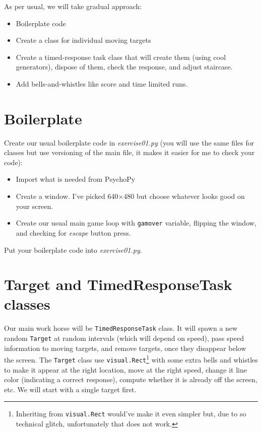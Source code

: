 \documentclass[
]{book}
\providecommand{\tightlist}{%
  \setlength{\itemsep}{0pt}\setlength{\parskip}{0pt}}
\begin{document}
As per usual, we will take gradual approach:

\begin{itemize}
\tightlist
\item
  Boilerplate code
\item
  Create a class for individual moving targets
\item
  Create a timed-response task class that will create them (using cool generators), dispose of them, check the response, and adjust staircase.
\item
  Add bells-and-whistles like score and time limited runs.
\end{itemize}

\hypertarget{boilerplate-1}{%
\section{Boilerplate}\label{boilerplate-1}}

Create our usual boilerplate code in \emph{exercise01.py} (you will use the same files for classes but use versioning of the main file, it makes it easier for me to check your code):

\begin{itemize}
\tightlist
\item
  Import what is needed from PsychoPy
\item
  Create a window. I've picked 640×480 but choose whatever looks good on your screen.
\item
  Create our usual main game loop with \texttt{gamover} variable, flipping the window, and checking for \emph{escape} button press.
\end{itemize}

Put your boilerplate code into \emph{exercise01.py}.

\hypertarget{target-and-timedresponsetask-classes}{%
\section{Target and TimedResponseTask classes}\label{target-and-timedresponsetask-classes}}

Our main work horse will be \texttt{TimedResponseTask} class. It will spawn a new random \texttt{Target} at random intervals (which will depend on speed), pass speed information to moving targets, and remove targets, once they disappear below the screen. The \texttt{Target} class use \texttt{visual.Rect}\footnote{Inheriting from \texttt{visual.Rect} would've make it even simpler but, due to so technical glitch, unfortunately that does not work.} with some extra bells and whistles to make it appear at the right location, move at the right speed, change it line color (indicating a correct response), compute whether it is already off the screen, etc. We will start with a single target first.
\end{document}
